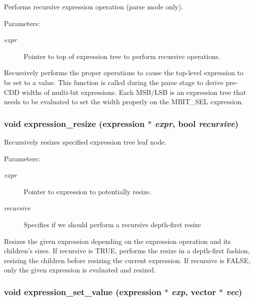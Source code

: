 Performs recursive expression operation (parse mode only).

\begin{Desc}
\item[Parameters: ]\par
\begin{description}
\item[{\em 
expr}]Pointer to top of expression tree to perform recursive operations.\end{description}
\end{Desc}
Recursively performs the proper operations to cause the top-level expression to be set to a value. This function is called during the parse stage to derive  pre-CDD widths of multi-bit expressions. Each MSB/LSB is an expression tree that  needs to be evaluated to set the width properly on the MBIT\_\-SEL expression. 
\subsubsection{\setlength{\rightskip}{0pt plus 5cm}void expression\_\-resize ({\bf expression} $\ast$ {\em expr}, {\bf bool} {\em recursive})}\label{expr_8c_a11}


Recursively resizes specified expression tree leaf node.

\begin{Desc}
\item[Parameters: ]\par
\begin{description}
\item[{\em 
expr}]Pointer to expression to potentially resize. \item[{\em 
recursive}]Specifies if we should perform a recursive depth-first resize\end{description}
\end{Desc}
Resizes the given expression depending on the expression operation and its children's sizes. If recursive is TRUE, performs the resize in a depth-first fashion, resizing the children before resizing the current expression. If recursive is FALSE, only the given expression is evaluated and resized. 
\subsubsection{\setlength{\rightskip}{0pt plus 5cm}void expression\_\-set\_\-value ({\bf expression} $\ast$ {\em exp}, {\bf vector} $\ast$ {\em vec})}\label{expr_8c_a10}


